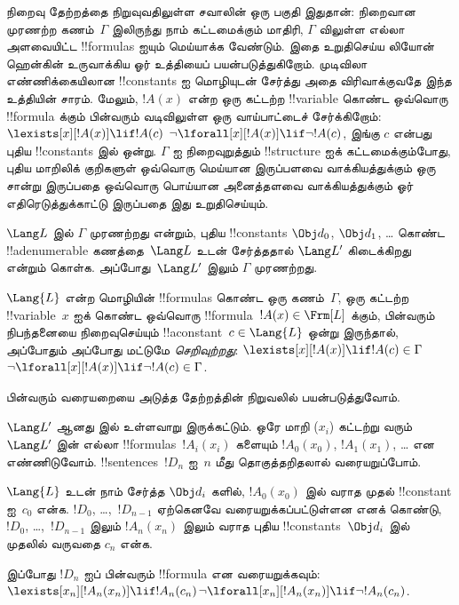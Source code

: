\documentclass[../../../include/open-logic-section]{subfiles}
\begin{document}


\begin{explain}
நிறைவு தேற்றத்தை நிறுவுவதிலுள்ள சவாலின் ஒரு பகுதி இதுதான்: நிறைவான முரணற்ற
கணம்~$\Gamma$ இலிருந்து நாம் கட்டமைக்கும் மாதிரி, $\Gamma$ விலுள்ள எல்லா
அளவையிட்ட !!{formula}s ஐயும் மெய்யாக்க வேண்டும். இதை உறுதிசெய்ய லியோன்
ஹென்கின் உருவாக்கிய ஓர் உத்தியைப் பயன்படுத்துகிறோம். முடிவிலா எண்ணிக்கையிலான
!!{constant}s ஐ மொழியுடன் சேர்த்து அதை விரிவாக்குவதே இந்த உத்தியின் சாரம்.
மேலும், $!A(x)$ என்ற ஒரு கட்டற்ற !!{variable} கொண்ட ஒவ்வொரு !!{formula}
க்கும் பின்வரும் வடிவிலுள்ள ஒரு வாய்பாட்டைச் சேர்க்கிறோம்:
      {$\lexists[x][!A(x)] \lif !A(c)$}
      {$\lnot\lforall[x][!A(x)] \lif \lnot !A(c)$},
இங்கு $c$ என்பது புதிய !!{constant}s இல் ஒன்று. $\Gamma$ ஐ நிறைவுறுத்தும்
!!{structure} ஐக் கட்டமைக்கும்போது, புதிய மாறிலிக் குறிகளுள்
{ஒவ்வொரு மெய்யான இருப்பளவை வாக்கியத்துக்கும் ஒரு சான்று இருப்பதை}
{ஒவ்வொரு பொய்யான அனைத்தளவை வாக்கியத்துக்கும் ஓர் எதிரெடுத்துக்காட்டு இருப்பதை}
இது உறுதிசெய்யும்.
\end{explain}

\begin{prop}
$\Lang L$ இல் $\Gamma$ முரணற்றது என்றும், புதிய !!{constant}s
$\Obj d_0$, $\Obj d_1$, \dots{} கொண்ட !!a{denumerable} கணத்தை~$\Lang L$
உடன் சேர்த்ததால் $\Lang L'$ கிடைக்கிறது என்றும் கொள்க. அப்போது~$\Lang L'$
இலும் $\Gamma$ முரணற்றது.
\end{prop}

\begin{defn}[செறிவுற்ற கணம்]
$\Lang {L}$ என்ற மொழியின் !!{formula}s கொண்ட ஒரு கணம்~$\Gamma$, ஒரு
கட்டற்ற !!{variable}~$x$ ஐக் கொண்ட ஒவ்வொரு
!!{formula}~$!A(x) \in \Frm[L]$ க்கும், பின்வரும் நிபந்தனையை நிறைவுசெய்யும்
!!a{constant}~$c \in \Lang{L}$ ஒன்று இருந்தால், அப்போதும் அப்போது மட்டுமே
\emph{செறிவுற்றது}:
      {$\lexists[x][!A(x)] \lif !A(c) \in \Gamma$}
      {$\lnot\lforall[x][!A(x)] \lif \lnot !A(c) \in \Gamma$}.
\end{defn}

பின்வரும் வரையறையை அடுத்த தேற்றத்தின் நிறுவலில் பயன்படுத்துவோம்.

\begin{defn}
$\Lang L'$ ஆனது  இல் உள்ளவாறு இருக்கட்டும். ஒரே மாறி
($x_i$) கட்டற்று வரும்~$\Lang L'$ இன் எல்லா
!!{formula}s~$!A_i(x_i)$ களையும் $!A_0(x_0)$, $!A_1(x_1)$, \dots{} என
எண்ணிடுவோம். !!{sentence}s~$!D_n$ ஐ~$n$ மீது தொகுத்தறிதலால் வரையறுப்போம்.

$\Lang{L}$ உடன் நாம் சேர்த்த $\Obj d_i$ களில், $!A_0(x_0)$ இல் வராத முதல்
!!{constant} ஐ~$c_0$ என்க. $!D_0$, \dots,~$!D_{n-1}$ ஏற்கெனவே
வரையறுக்கப்பட்டுள்ளன எனக் கொண்டு, $!D_0$, \dots,~$!D_{n-1}$ இலும்
$!A_n(x_n)$ இலும் வராத புதிய !!{constant}s~$\Obj d_i$ இல் முதலில் வருவதை
$c_n$ என்க.

இப்போது $!D_{n}$ ஐப் பின்வரும் !!{formula} என வரையறுக்கவும்:
{$\lexists[x_{n}][!A_{n}(x_{n})] \lif
  !A_{n}(c_{n})$}{$\lnot\lforall[x_{n}][!A_{n}(x_{n})] \lif \lnot
  !A_{n}(c_{n})$}.
\end{defn}
\end{document}
